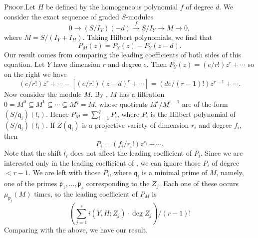 {\noindent\textsc{Proof.}\enspace Let $H$ be defined by the homogeneous polynomial $f$ of degree $d$. We consider the exact sequence of graded $S$-modules
\[
0\longrightarrow (S/I_Y)(-d)\xrightarrow{f}S/I_Y\longrightarrow M\longrightarrow0,
\]
where $M=S/(I_Y+I_H)$. Taking Hilbert polynomials, we find that
\[
P_M(z)=P_Y(z)-P_Y(z-d).
\]
Our result comes from comparing the leading coefficients of both sides of this equation. Let $Y$ have dimension $r$ and degree $e$. Then $P_Y(z)=(e/r!)z^r+\cdots$ so on the right we have
\[
(e/r!)z^r+\cdots-[(e/r!)(z-d)^r+\cdots]=(de/(r-1)!)z^{r-1}+\cdots.
\]
Now consider the module $M$. By , $M$ has a filtration $0=M^0\subseteq M^1\subseteq\cdots\subseteq M^q=M$, whose quotients $M^i/M^{i-1}$ are of the form $(S/\mathfrak q_i)(l_i)$. Hence $P_M=\sum_{i=1}^{q}P_i$, where $P_i$ is the Hilbert polynomial of $(S/\mathfrak q_i)(l_i)$. If $Z(\mathfrak q_i)$ is a projective variety of dimension $r_i$ and degree $f_i$, then
\[
P_i=(f_i/r_i!)z^{r_i}+\cdots.
\]
Note that the shift $l_i$ does not affect the leading coefficient of $P_i$. Since we are interested only in the leading coefficient of \hypertarget{err-I-7-7}{}, we can ignore those $P_i$ of degree $<r-1$. We are left with those $P_i$, where $\mathfrak q_i$ is a minimal prime of $M$, namely, one of the primes $\mathfrak p_1,\ldots,\mathfrak p_s$ corresponding to the $Z_j$. Each one of these occurs $\mu_{\mathfrak p_j}(M)$ times, so the leading coefficient of $P_M$ is
\[
\left(\sum_{j=1}^{s}i(Y,H;Z_j)\cdot\deg Z_j\right)/(r-1)!
\]
Comparing with the above, we have our result.}
